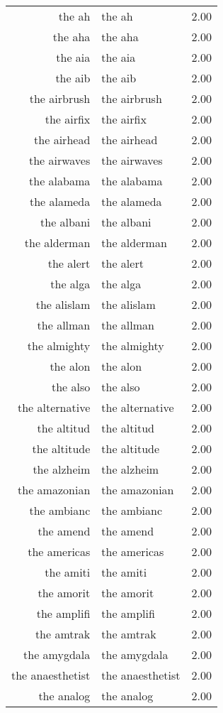 \begin{table}[ht]
\begin{tabular}{rlr}
  the ah & the ah & 2.00 \\ 
  the aha & the aha & 2.00 \\ 
  the aia & the aia & 2.00 \\ 
  the aib & the aib & 2.00 \\ 
  the airbrush & the airbrush & 2.00 \\ 
  the airfix & the airfix & 2.00 \\ 
  the airhead & the airhead & 2.00 \\ 
  the airwaves & the airwaves & 2.00 \\ 
  the alabama & the alabama & 2.00 \\ 
  the alameda & the alameda & 2.00 \\ 
  the albani & the albani & 2.00 \\ 
  the alderman & the alderman & 2.00 \\ 
  the alert & the alert & 2.00 \\ 
  the alga & the alga & 2.00 \\ 
  the alislam & the alislam & 2.00 \\ 
  the allman & the allman & 2.00 \\ 
  the almighty & the almighty & 2.00 \\ 
  the alon & the alon & 2.00 \\ 
  the also & the also & 2.00 \\ 
  the alternative & the alternative & 2.00 \\ 
  the altitud & the altitud & 2.00 \\ 
  the altitude & the altitude & 2.00 \\ 
  the alzheim & the alzheim & 2.00 \\ 
  the amazonian & the amazonian & 2.00 \\ 
  the ambianc & the ambianc & 2.00 \\ 
  the amend & the amend & 2.00 \\ 
  the americas & the americas & 2.00 \\ 
  the amiti & the amiti & 2.00 \\ 
  the amorit & the amorit & 2.00 \\ 
  the amplifi & the amplifi & 2.00 \\ 
  the amtrak & the amtrak & 2.00 \\ 
  the amygdala & the amygdala & 2.00 \\ 
  the anaesthetist & the anaesthetist & 2.00 \\ 
  the analog & the analog & 2.00 \\ 

\end{tabular}
\end{table}
